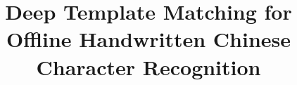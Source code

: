 \documentclass[conference]{IEEEtran}
\begin{document}
%
\title{Deep Template Matching for Offline Handwritten Chinese Character Recognition}


\author{
\and
{}
\and
{}
\and
{}
}


% 








\maketitle
\end{document}
